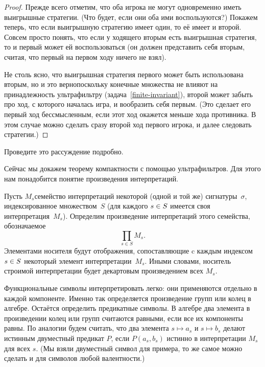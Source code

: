\begin{proof}
Прежде всего отметим, что оба игрока не могут одновременно
иметь выигрышные стратегии. (Что будет, если они оба ими
воспользуются?) Покажем теперь, что если выигрышную стратегию
имеет один, то её имеет и второй. Совсем просто понять, что если
у ходящего вторым есть выигрышная стратегия, то и первый может
ей воспользоваться (он должен представить себя вторым, считая,
что первый на первом ходу ничего не взял).

Не столь ясно, что выигрышная стратегия первого может быть
использована вторым, но и это верно\т поскольку конечные
множества не влияют на принадлежность ультрафильтру
(задача~\ref{finite-invariant}), второй может забыть про ход, с
которого началась игра, и вообразить себя первым. (Это сделает
его первый ход бессмысленным, если этот ход окажется меньше хода
противника. В этом случае можно сделать сразу второй ход первого игрока,
и далее следовать стратегии.)
\end{proof}

\begin{problem}
Проведите это рассуждение подробно.
\end{problem}

\smallskip

Сейчас мы докажем теорему компактности с помощью ультрафильтров.
Для этого нам понадобится понятие произведения интерпретаций.

Пусть $M_s$\т семейство интерпретаций некоторой (одной и той же)
сигнатуры~$\sigma$, индексированное множеством~$S$ (для каждого
$s\hm\in S$ имеется своя интерпретация~$M_s$). Определим
произведение интерпретаций этого семейства, обозначаемое
        $$
\prod_{s\in S} M_s.
        $$
Элементами носителя будут отображения, сопоставляющие c каждым
индексом $s\hm\in S$ некоторый элемент интерпретации~$M_s$.
Иными словами, носитель строимой интерпретации будет декартовым
произведением всех $M_s$.

Функциональные символы интерпретировать легко: они применяются
отдельно в каждой компоненте. Именно так определяется
произведение групп или колец в алгебре. Остаётся определить
предикатные символы. В алгебре два элемента в произведении колец
или групп считаются равными, если все их компоненты равны. По
аналогии будем считать, что два элемента $s\mapsto a_s$ и
$s\mapsto b_s$ делают истинным двуместный предикат $P$, если
$P(a_s,b_s)$ истинно в интерпретации $M_s$ для всех $s$. (Мы
взяли двуместный символ для примера, то же самое можно сделать и
для символов любой валентности.)

